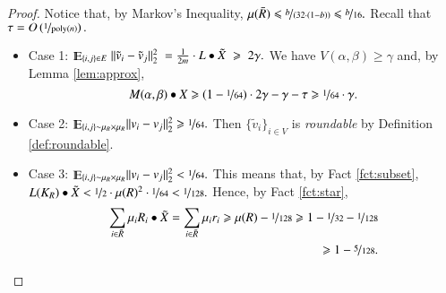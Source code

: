 \documentclass[twoside,leqno,twocolumn]{article}
\newcommand{\nfrac}{\nicefrac}
\renewcommand{\mathbb}{\varmathbb}
\renewcommand{\leq}{\leqslant}
\renewcommand{\geq}{\geqslant}
\newcommand{\norm}[1]{\lVert#1\rVert}
\newcommand{\poly}{\mathrm{poly}}
\newcommand{\Esymb}{\mathbb{E}}
\DeclareMathOperator*{\E}{\Esymb}
\numberwithin{equation}{section}
\begin{document}
\begin{proof}
Notice that, by Markov's Inequality,  $\mu(\bar{R}) \leq \nfrac{b}{(32 \cdot(1-b))} \leq \nfrac{b}{16}.$ Recall that $\tau = O\left(\nfrac{1}{\poly(n)}\right).$
\begin{itemize}
\item {\sc Case 1}: $\E_{\{i,j\} \in E}\;\norm{\tilde{v}_i-\tilde{v}_j}_2^2 \;= \frac{1}{2m} \cdot L \bullet \tilde{X} \; \geq \; 2\gamma .$ We have $V(\alpha, \beta) \geq \gamma$ and, by Lemma \ref{lem:approx}, 
$$
M(\alpha, \beta) \bullet X \geq (1 - \nfrac{1}{64}) \cdot  2\gamma - \gamma - \tau \geq \nfrac{1}{64} \cdot \gamma.
$$
\item {\sc Case 2}: $\E_{\{i,j\} \sim \mu_R \times \mu_R }\norm{v_i - v_j}_2^2 \geq \nfrac{1}{64}.$ Then $\{\tilde{v}_{i}\}_{i\in V}$ is {\it roundable} by Definition \ref{def:roundable}.

\item {\sc Case 3}: $\E_{\{i,j\} \sim \mu_R \times \mu_R }\norm{v_i - v_j}_2^2 < \nfrac{1}{64}.$  This means that, by Fact \ref{fct:subset}, $L(K_R) \bullet \tilde{X} < \nfrac{1}{2} \cdot \mu(R)^2 \cdot \nfrac{1}{64} < \nfrac{1}{128}.$ Hence, by Fact \ref{fct:star},
\begin{align*}
\sum_{i \in \bar{R}} \mu_i R_i \bullet \tilde{X} =  
\sum_{i \in \bar{R}} \mu_i r_i
\geq \mu(R) - \nfrac{1}{128} \geq 1 - \nfrac{1}{32} - \nfrac{1}{128}\\ \geq 1 - \nfrac{5}{128}.
\end{align*}


\end{itemize}
\end{proof}
\end{document}
